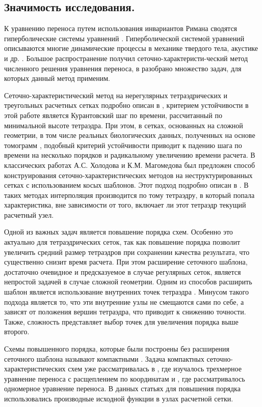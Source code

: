 \documentclass[14pt]{article}
\begin{document}
\subsection*{Значимость исследования.}
К уравнению переноса путем использования инвариантов Римана сводятся гиперболические системы уравнений \cite{1}. 
Гиперболической системой уравнений описываются многие динамические процессы в механике твердого тела, акустике и др. \cite{2}.  
Большое распространение получил сеточно-характеристи-ческий метод численного решения уравнения переноса, в \cite{3} разобрано множество задач, для которых данный метод применим. 

Сеточно-характеристический метод на нерегулярных тетраэдрических и треугольных расчетных сетках подробно описан в \cite{4}, критерием устойчивости в этой работе является Курантовский шаг по времени, рассчитанный по минимальной высоте тетраэдра.
При этом, в сетках, основанных на сложной геометрии, в том числе реальных биологических данных, полученных на основе томограмм \cite{5}, подобный критерий устойчивости приводит к падению шага по времени на несколько порядков и радикальному увеличению времени расчета.
В классических работах А.С. Холодова и К.М. Магомедова был предложен способ конструирования сеточно-характеристических методов на неструктурированных сетках с использованием косых шаблонов.
Этот подход подробно описан в \cite{6}.
В таких методах интерполяция производится по тому тетраэдру, в который попала характеристика, вне зависимости от того, включает ли этот тетраэдр текущий расчетный узел.

Одной из важных задач является повышение порядка схем. 
Особенно это актуально для тетраэдрических сеток, так как повышение порядка позволит увеличить средний размер тетраэдров при сохранении качества результата, что существенно снизит время расчета.
При этом расширение сеточного шаблона, достаточно очевидное и предсказуемое в случае регулярных сеток, является непростой задачей в случае сложной геометрии. 
Одним из способов расширить шаблон является использование внутренних точек тетраэдра \cite{7}.
Минусом такого подхода является то, что эти внутренние узлы не смещаются сами по себе, а зависят от положения вершин тетраэдра, что приводит к снижению точности.
Также, сложность представляет выбор точек для увеличения порядка выше второго.

Схемы повышенного порядка, которые были построены без расширения сеточного шаблона называют компактными \cite{8}. 
Задача  компактных сеточно-характеристических схем уже рассматривалась в \cite{9}, где изучалось трехмерное уравнение переноса с расщеплением по координатам и \cite{10}, где рассматривалось одномерное уравнение переноса. 
В данных статьях для повышения порядка использовались производные исходной функции в узлах расчетной сетки. 
\end{document}
